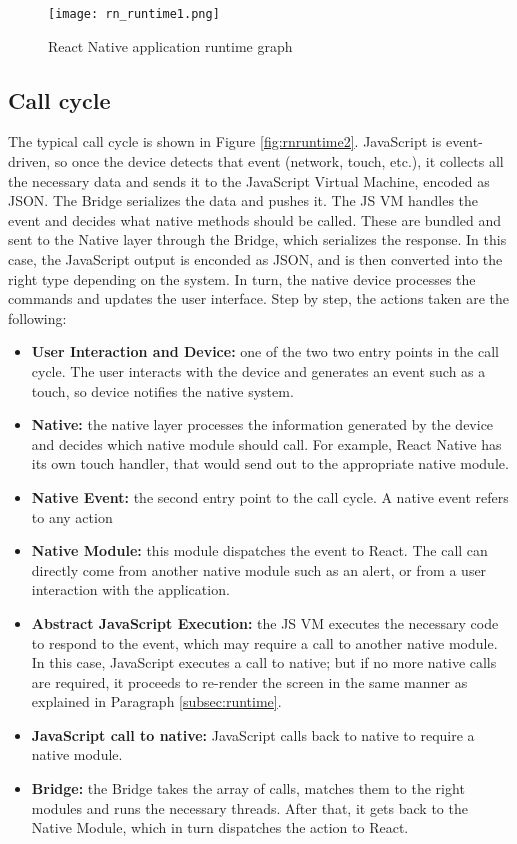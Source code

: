 \begin{figure}[H]
	\centering
	\texttt{[image: rn\_runtime1.png]}
	\caption{React Native application runtime graph\label{fig:rnruntime1}}
\end{figure}

\subsection{Call cycle}

The typical  call cycle is shown in Figure \ref{fig:rnruntime2}. JavaScript is event-driven, so once the device detects that event (network, touch, etc.), it collects all the necessary data and sends it to the JavaScript Virtual Machine, encoded as JSON. The Bridge serializes the data and pushes it. The JS VM handles the event and decides what native methods should be called. These are bundled and sent to the Native layer through the Bridge, which serializes the response. In this case, the JavaScript output is enconded as JSON, and is then converted into the right type depending on the system. In turn, the native device processes the commands and updates the user interface. Step by step, the actions taken are the following:

\begin{itemize}
 \item \textbf{User Interaction and Device:} one of the two two entry points in the call cycle. The user interacts with the device and generates an event such as a touch, so device notifies the native system.
 \item \textbf{Native:} the native layer processes the information generated by the device and decides which native module should call. For example, React Native has its own touch handler, that would send out to the appropriate native module.
 \item \textbf{Native Event:} the second entry point to the call cycle. A native event refers to any action 
 \item \textbf{Native Module:} this module dispatches the event to React. The call can directly come from another native module such as an alert, or from a user interaction with the application.
 \item \textbf{Abstract JavaScript Execution:} the JS VM executes the necessary code to respond to the event, which may require a call to another native module. In this case, JavaScript executes a call to native; but if no more native calls are required, it proceeds to re-render the screen in the same manner as explained in Paragraph \ref{subsec:runtime}.
 \item \textbf{JavaScript call to native:} JavaScript calls back to native to require a native module.
 \item \textbf{Bridge:} the Bridge takes the array of calls, matches them to the right modules and runs the necessary threads. After that, it gets back to the Native Module, which in turn dispatches the action to React.
\end{itemize}

